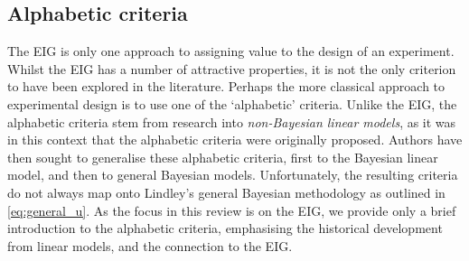 \documentclass[a4paper, 10pt]{report}
\theoremstyle{plain}
\begin{document}
	
	
	\subsection{Alphabetic criteria}
	
	The EIG is only one approach to assigning value to the design of an experiment.
	Whilst the EIG has a number of attractive properties, it is not the only criterion to have been explored in the literature.
	Perhaps the more classical approach to experimental design is to use one of the `alphabetic' criteria.
	Unlike the EIG, the alphabetic criteria stem from research into \emph{non-Bayesian linear models}, as it was in this context that the alphabetic criteria were originally proposed.
	Authors have then sought to generalise these alphabetic criteria, first to the Bayesian linear model, and then to general Bayesian models.
	Unfortunately, the resulting criteria do not always map onto Lindley's general Bayesian methodology as outlined in \eqref{eq:general_u}.
	As the focus in this review is on the EIG, we provide only a brief introduction to the alphabetic criteria, emphasising the historical development from linear models, and the connection to the EIG.
	
	
	
\end{document}
